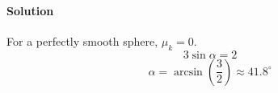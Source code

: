 \documentclass{article}
\begin{document}
{\begin{enumerate}
\begin{enumerate}
				\paragraph{Solution} For a perfectly smooth sphere, $\mu_k = 0$. \unboldmath
				\[
					3 \sin \alpha = 2
				\]
				\[
					\alpha = \arcsin(\frac{3}{2}) \approx 41.8^{\circ}
				\] \boldmath
			\end{enumerate}
		\end{enumerate}
	
	\unboldmath
	
%		
% 	

}
\end{document}
